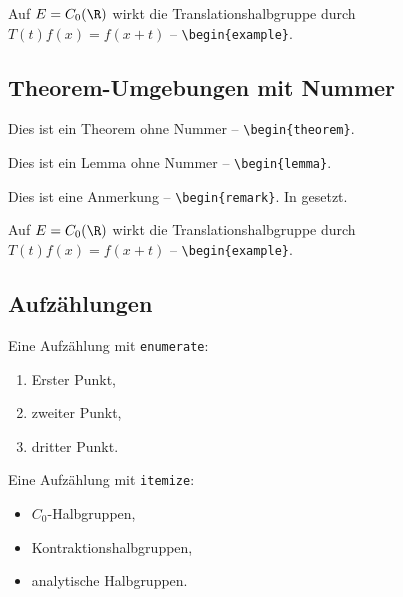 \begin{refsection}
\begin{example}
Auf $E = C_0(\R)$ wirkt die Translationshalbgruppe durch
$T(t)f(x) = f(x+t)$ -- \verb|\begin{example}|.
\end{example}

\subsection*{Theorem-Umgebungen mit Nummer}

\begin{ntheorem}
Dies ist ein Theorem ohne Nummer -- \verb|\begin{theorem}|.
\end{ntheorem}

\begin{nlemma}
Dies ist ein Lemma ohne Nummer -- \verb|\begin{lemma}|.
\end{nlemma}

\begin{nremark}
Dies ist eine Anmerkung -- \verb|\begin{remark}|.
In \texttt{\small} gesetzt.
\end{nremark}

\begin{nexample}
Auf $E = C_0(\R)$ wirkt die Translationshalbgruppe durch
$T(t)f(x) = f(x+t)$ -- \verb|\begin{example}|.
\end{nexample}

\subsection*{Aufzählungen}

Eine Aufzählung mit \texttt{enumerate}:
\begin{enumerate}[\upshape(i)]
    \item Erster Punkt,
    \item zweiter Punkt,
    \item dritter Punkt.
\end{enumerate}

Eine Aufzählung mit \texttt{itemize}:
\begin{itemize}
    \item $C_0$-Halbgruppen,
    \item Kontraktionshalbgruppen,
    \item analytische Halbgruppen.
\end{itemize}


\end{refsection}
